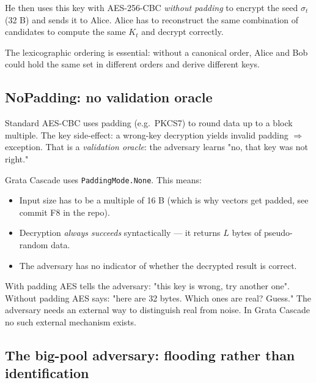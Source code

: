\documentclass[11pt,a4paper]{article}
\begin{document}
He then uses this key with AES-256-CBC \emph{without padding} to encrypt the seed $\sigma_t$ (32 B) and sends it to Alice. Alice has to reconstruct the same combination of candidates to compute the same $K_t$ and decrypt correctly.

The lexicographic ordering is essential: without a canonical order, Alice and Bob could hold the same set in different orders and derive different keys.

\subsection{NoPadding: no validation oracle}

Standard AES-CBC uses padding (e.g.\ PKCS7) to round data up to a block multiple. The key side-effect: a wrong-key decryption yields invalid padding $\Rightarrow$ exception. That is a \emph{validation oracle}: the adversary learns "no, that key was not right."

Grata Cascade uses \texttt{PaddingMode.None}. This means:
\begin{itemize}[leftmargin=*]
\item Input size has to be a multiple of 16 B (which is why vectors get padded, see commit F8 in the repo).
\item Decryption \emph{always succeeds} syntactically --- it returns $L$ bytes of pseudo-random data.
\item The adversary has no indicator of whether the decrypted result is correct.
\end{itemize}

\begin{aha}
With padding AES tells the adversary: "this key is wrong, try another one". Without padding AES says: "here are 32 bytes. Which ones are real? Guess." The adversary needs an external way to distinguish real from noise. In Grata Cascade no such external mechanism exists.
\end{aha}

\subsection{The big-pool adversary: flooding rather than identification}
\end{document}
